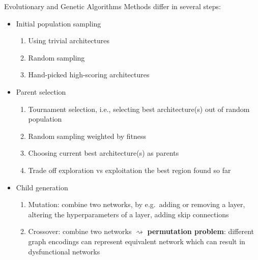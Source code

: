 \documentclass[main]{subfiles}
\begin{document}
\begin{frame}{Evolutionary and Genetic Algorithms}
Methods differ in several steps:
\pause
\begin{itemize}
    \item Initial population sampling 
    \begin{enumerate}
        \item Using trivial architectures
        \item Random sampling
        \item Hand-picked high-scoring architectures
    \end{enumerate}
    \pause
    \item Parent selection 
    \begin{enumerate}
        \item Tournament selection, i.e., selecting best architecture(s) out of random population
        \item Random sampling weighted by fitness
        \item Choosing current best architecture(s) as parents 
        \item Trade off exploration vs exploitation the best region found so far
    \end{enumerate}
    \pause
    \item Child generation 
    \begin{enumerate}
        \item Mutation: combine two networks, by e.g.\ adding or removing a layer, altering the hyperparameters of a layer, adding skip connections
        \item Crossover: combine two networks $\rightsquigarrow$ \textbf{permutation problem}: different graph encodings can represent equivalent network which can result in dysfunctional networks
    \end{enumerate}
\end{itemize}
\end{frame}
\end{document}
